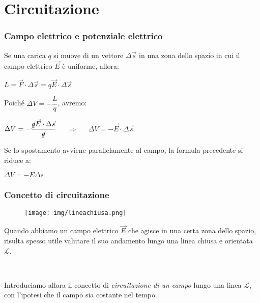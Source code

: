 \documentclass[]{beamer}
\theoremstyle{plain}
\begin{document}
\section{Circuitazione}



\begin{frame}
\frametitle{Campo elettrico e potenziale elettrico}
Se una carica $ q $ si muove di un vettore $ \Delta \vec{s} $ in una zona dello spazio in cui il campo elettrico $ \vec{E} $ è uniforme, allora:
\begin{center}
$ L = \vec{F} \cdot \Delta \vec{s} = q\vec{E} \cdot \Delta \vec{s} $
\end{center}\pause
Poiché $ \Delta V = - \dfrac{L}{q} $, avremo:
\begin{center}
$ \Delta V = - \dfrac{\cancel{q}\vec{E} \cdot \Delta \vec{s}}{\cancel{q}} $ \pause$~~~~~ \Longrightarrow ~~~~~  $ \colorbox{blue!30}{$ \Delta V = - \vec{E} \cdot \Delta \vec{s} $} 
\end{center}\pause
Se lo spostamento avviene parallelamente al campo, la formula precedente si riduce a:
\begin{center}
\colorbox{blue!30}{$ \Delta V = - E \Delta s $} 
\end{center}
\end{frame}




\begin{frame}
\frametitle{Concetto di circuitazione}
\begin{figure}
\texttt{[image: img/lineachiusa.png]}
\end{figure}
Quando abbiamo un campo elettrico $ \vec{E} $ che agisce in una certa zona dello spazio, risulta spesso utile valutare il suo andamento lungo una linea chiusa e orientata $ \mathscr{L} $.\pause

~

Introduciamo allora il concetto di \emph{circuitazione di un campo} lungo una linea $ \mathscr{L} $, con l'ipotesi che il campo sia costante nel tempo.
\end{frame}
\end{document}
